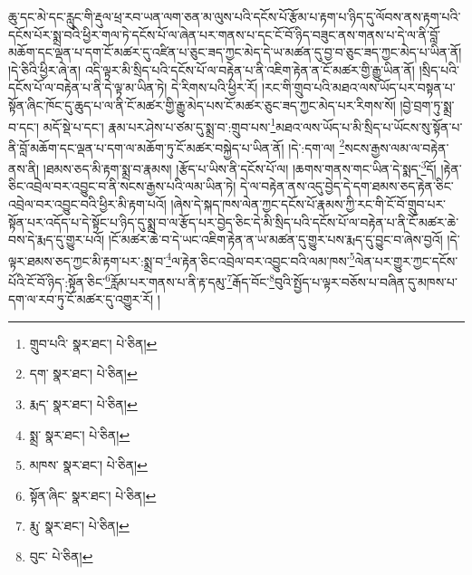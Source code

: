 ཆུ་དང་མེ་དང་རླུང་གི་རྡུལ་ཕྲ་རབ་ཡན་ལག་ཅན་མ་ལུས་པའི་དངོས་པོ་རྩོམ་པ་རྟག་པ་ཉིད་དུ་ལོབས་ནས་རྟག་པའི་དངོས་པོར་སྨྲ་བའི་ཕྱིར་གལ་ཏེ་དངོས་པོ་ལ་ཞེན་པར་གནས་པ་དང་ངོ་བོ་ཉིད་བཟུང་ནས་གནས་པ་དེ་ལ་ནི་བློ་མཆོག་དང་ལྡན་པ་དག་ངོ་མཚར་དུ་འཛིན་པ་ཅུང་ཟད་ཀྱང་མེད་དེ་ཡ་མཚན་དུ་བྱ་བ་ཅུང་ཟད་ཀྱང་མེད་པ་ཡིན་ནོ། །དེ་ཅིའི་ཕྱིར་ཞེ་ན། འདི་ལྟར་མི་སྲིད་པའི་དངོས་པོ་ལ་བརྟེན་པ་ནི་འཇིག་རྟེན་ན་ངོ་མཚར་གྱི་རྒྱུ་ཡིན་ནོ། །སྲིད་པའི་དངོས་པོ་ལ་བརྟེན་པ་ནི་དེ་ལྟ་མ་ཡིན་ཏེ། དེ་རིགས་པའི་ཕྱིར་རོ། །རང་གི་གྲུབ་པའི་མཐའ་ལས་ཡོད་པར་བསྟན་པ་སྟོན་ཞིང་ཁོང་དུ་ཆུད་པ་ལ་ནི་ངོ་མཚར་གྱི་རྒྱུ་མེད་པས་ངོ་མཚར་ཅུང་ཟད་ཀྱང་མེད་པར་རིགས་སོ། །བྱེ་བྲག་ཏུ་སྨྲ་བ་དང་། མདོ་སྡེ་པ་དང་། རྣམ་པར་ཤེས་པ་ཙམ་དུ་སྨྲ་བ་:གྲུབ་པས་\footnote{གྲུབ་པའི་  སྣར་ཐང་།  པེ་ཅིན། }མཐའ་ལས་ཡོད་པ་མི་སྲིད་པ་ཡོངས་སུ་སྟོན་པ་ནི་བློ་མཆོག་དང་ལྡན་པ་དག་ལ་མཆོག་ཏུ་ངོ་མཚར་བསྐྱེད་པ་ཡིན་ནོ། །དེ་:དག་ལ། \footnote{དག་  སྣར་ཐང་།  པེ་ཅིན། }སངས་རྒྱས་ལམ་ལ་བརྟེན་ནས་ནི། །ཐམས་ཅད་མི་རྟག་སྨྲ་བ་རྣམས། །རྩོད་པ་ཡིས་ནི་དངོས་པོ་ལ། །ཆགས་གནས་གང་ཡིན་དེ་སྨད་\footnote{རྨད་  སྣར་ཐང་།  པེ་ཅིན། }དོ། །རྟེན་ཅིང་འབྲེལ་བར་འབྱུང་བ་ནི་སངས་རྒྱས་པའི་ལམ་ཡིན་ཏེ། དེ་ལ་བརྟེན་ནས་འདུ་བྱེད་དེ་དག་ཐམས་ཅད་རྟེན་ཅིང་འབྲེལ་བར་འབྱུང་བའི་ཕྱིར་མི་རྟག་པའོ། །ཞེས་དེ་སྐད་ཁས་ལེན་ཀྱང་དངོས་པོ་རྣམས་ཀྱི་རང་གི་ངོ་བོ་གྲུབ་པར་སྟོན་པར་འདོད་པ་དེ་སྟོང་པ་ཉིད་དུ་སྨྲ་བ་ལ་རྩོད་པར་བྱེད་ཅིང་དེ་མི་སྲིད་པའི་དངོས་པོ་ལ་བརྟེན་པ་ནི་ངོ་མཚར་ཆེ་བས་དེ་རྨད་དུ་གྱུར་པའོ། །ངོ་མཚར་ཆེ་བ་དེ་ཡང་འཇིག་རྟེན་ན་ཡ་མཚན་དུ་གྱུར་པས་རྨད་དུ་བྱུང་བ་ཞེས་བྱའོ། །དེ་ལྟར་ཐམས་ཅད་ཀྱང་མི་རྟག་པར་:སྨྲ་བ་\footnote{སྨྲ་  སྣར་ཐང་།  པེ་ཅིན། }ལ་རྟེན་ཅིང་འབྲེལ་བར་འབྱུང་བའི་ལམ་ཁས་\footnote{མཁས་  སྣར་ཐང་།  པེ་ཅིན། }ལེན་པར་གྱུར་ཀྱང་དངོས་པོའི་ངོ་བོ་ཉིད་:སྟོན་ཅིང་\footnote{སྟོན་ཞིང་  སྣར་ཐང་།  པེ་ཅིན། }རློམ་པར་གནས་པ་ནི་རྟ་དམུ་\footnote{རྨུ་  སྣར་ཐང་།  པེ་ཅིན། }རྒོད་བོང་\footnote{བུང་  པེ་ཅིན། }བུའི་སྤྱོད་པ་ལྟར་བཅོས་པ་བཞིན་དུ་མཁས་པ་དག་ལ་རབ་ཏུ་ངོ་མཚར་དུ་འགྱུར་རོ། །
